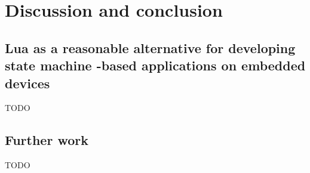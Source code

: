 \chapter{Discussion and conclusion}
\label{ch:discussion_conclusion}

\section{Lua as a reasonable alternative for developing state machine -based applications on embedded devices}
TODO

\section{Further work}
TODO